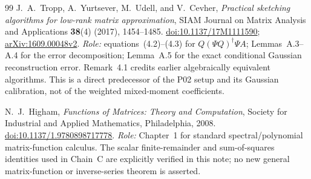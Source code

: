 \documentclass[11pt]{article}
\numberwithin{equation}{section}
\theoremstyle{definition}\newtheorem{definition}[theorem]{Definition}
\theoremstyle{remark}\newtheorem{remark}[theorem]{Remark}
\begin{document}
\begin{thebibliography}{99}
J.~A.~Tropp, A.~Yurtsever, M.~Udell, and V.~Cevher,
\emph{Practical sketching algorithms for low-rank matrix approximation},
SIAM Journal on Matrix Analysis and Applications \textbf{38}(4) (2017),
1454--1485.
\href{https://doi.org/10.1137/17M1111590}{doi:10.1137/17M1111590};
\href{https://arxiv.org/abs/1609.00048v2}{arXiv:1609.00048v2}.
\textit{Role:} equations~(4.2)--(4.3) for $Q(\Psi Q)^\dagger\Psi A$;
Lemmas~A.3--A.4 for the error decomposition; Lemma~A.5 for the exact
conditional Gaussian reconstruction error. Remark~4.1 credits earlier
algebraically equivalent algorithms. This is a direct predecessor of the P02
setup and its Gaussian calibration, not of the weighted mixed-moment coefficients.

N.~J.~Higham,
\emph{Functions of Matrices: Theory and Computation},
Society for Industrial and Applied Mathematics, Philadelphia, 2008.
\href{https://doi.org/10.1137/1.9780898717778}{doi:10.1137/1.9780898717778}.
\textit{Role:} Chapter~1 for standard spectral/polynomial matrix-function
calculus. The scalar finite-remainder and sum-of-squares identities used in
Chain~C are explicitly verified in this note; no new general matrix-function
or inverse-series theorem is asserted.

\end{thebibliography}
\end{document}
